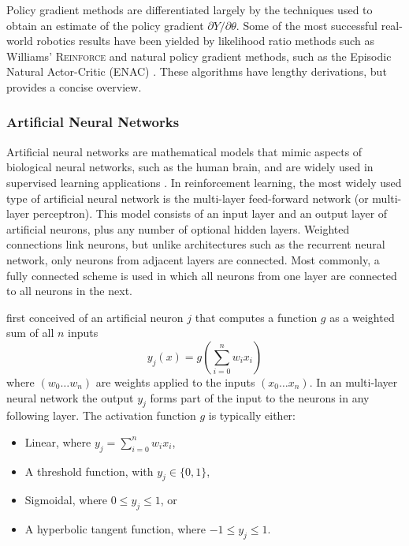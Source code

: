 Policy gradient methods are differentiated largely by the techniques used to
obtain an estimate of the policy gradient $\partial Y / \partial \theta$. Some
of the most successful real-world robotics results
\cite{glynn87,aleksandrov68,benbrahim:1996} have been yielded by likelihood
ratio methods such as Williams' \textsc{Reinforce} \cite{williams:reinforce} and
natural policy gradient methods, such as the Episodic Natural Actor-Critic
(ENAC) \cite{peters:enac}. These algorithms have lengthy derivations, but
 provides a concise overview.

\subsubsection{Artificial Neural Networks}
Artificial neural networks are mathematical models that mimic aspects of
biological neural networks, such as the human brain, and are widely used in
supervised learning applications \cite{bishop96ann,fausett94}.
In reinforcement learning, the most widely used type of artificial neural
network is the multi-layer feed-forward network (or multi-layer perceptron).
This model consists of an input layer and an output layer of artificial neurons,
plus any number of optional hidden layers.  Weighted connections link
neurons, but unlike architectures such as the recurrent neural network, only
neurons from adjacent layers are connected.  Most commonly, a fully connected
scheme is used in which all neurons from one layer are connected to all neurons in the
next.


 first conceived of an artificial neuron $j$ that
computes a function $g$ as a weighted sum of all $n$ inputs
\begin{equation}
y_j(x) = g \left(\sum_{i=0}^n w_ix_i\right)
\end{equation}
where $(w_0 \dotsc w_n)$ are weights applied to the inputs $(x_0 \dotsc x_n)$.
In an multi-layer neural network the output $y_j$ forms part of the input
to the neurons in any following layer.  The activation function $g$ is
typically either:
\begin{itemize}
  \item Linear, where $y_j = \sum_{i=0}^n w_ix_i$,
  \item A threshold function, with $y_j \in \lbrace 0,1 \rbrace$,
  \item Sigmoidal, where $0 \leq y_j \leq 1$, or
  \item A hyperbolic tangent function, where $-1 \leq y_j \leq 1$.
\end{itemize}

